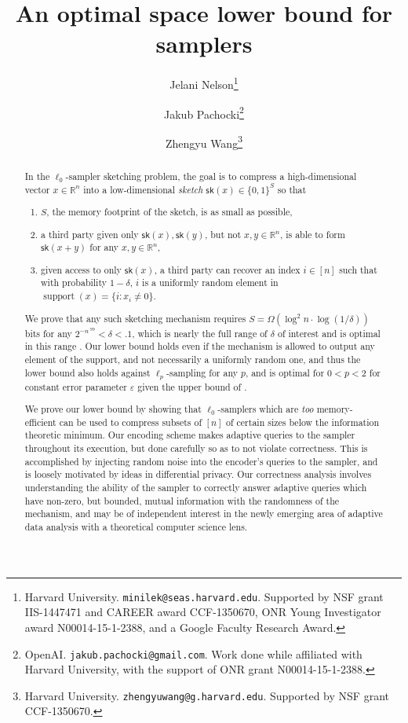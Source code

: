 \documentclass[10pt]{article}
\title{An optimal space lower bound for samplers}
\author{Jelani Nelson\thanks{Harvard University. \texttt{minilek@seas.harvard.edu}. Supported by NSF grant IIS-1447471 and
   CAREER award CCF-1350670, ONR Young Investigator award N00014-15-1-2388, and a Google Faculty Research Award.}
  \and Jakub Pachocki\thanks{OpenAI. \texttt{jakub.pachocki@gmail.com}. Work done while affiliated with Harvard University, with the support of ONR grant N00014-15-1-2388.}
  \and Zhengyu Wang\thanks{Harvard University. \texttt{zhengyuwang@g.harvard.edu}. Supported by NSF grant CCF-1350670.}}
\newcommand{\R}{\mathbb{R}}
\newcommand{\sk}{\mathsf{sk}}
\newcommand{\eps}{\varepsilon}
\begin{document}
\maketitle

\begin{abstract}
In the $\ell_0$-sampler sketching problem, the goal is to compress a high-dimensional vector $x\in\R^n$ into a low-dimensional {\em sketch} $\sk(x)\in\{0,1\}^S$ so that
\begin{enumerate}
\item $S$, the memory footprint of the sketch, is as small as possible,
\item a third party given only $\sk(x), \sk(y)$, but not $x, y\in\R^n$, is able to form $\sk(x+y)$ for any $x,y\in\R^n$,
\item given access to only $\sk(x)$, a third party can recover an index $i\in[n]$ such that with probability $1-\delta$, $i$ is a uniformly random element in $\mathop{support}(x) = \{i : x_i\neq 0\}$.
\end{enumerate}
We prove that any such sketching mechanism requires $S = \Omega(\log^2 n\cdot \log(1/\delta))$ bits for any $2^{-n^{.99}} < \delta < .1$, which is nearly the full range of $\delta$ of interest and is optimal in this range \cite{JowhariST11}. Our lower bound holds even if the mechanism is allowed to output any element of the support, and not necessarily a uniformly random one, and thus the lower bound also holds against $\ell_p$-sampling for any $p$, and is optimal for $0<p<2$ for constant error parameter $\eps$ given the upper bound of \cite{JowhariST11}. 

We prove our lower bound by showing that $\ell_0$-samplers which are {\em too} memory-efficient can be used to compress subsets of $[n]$ of certain sizes below the information theoretic minimum. Our encoding scheme makes adaptive queries to the sampler throughout its execution, but done carefully so as to not violate correctness. This is accomplished by injecting random noise into the encoder's queries to the sampler, and is loosely motivated by ideas in differential privacy. Our correctness analysis involves understanding the ability of the sampler to correctly answer adaptive queries which have non-zero, but bounded, mutual information with the randomness of the mechanism, and may be of independent interest in the newly emerging area of adaptive data analysis with a theoretical computer science lens.
\end{abstract}








\end{document}
